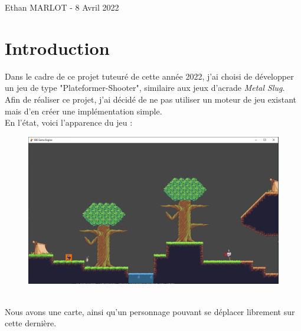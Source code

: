 \documentclass[12pt, openany]{report}
\begin{document}
\begin{titlepage}
\begin{rmfamily}
\begin{center}
    \vfill

    {\large Ethan \textsc{MARLOT} - 8 Avril 2022}

  \end{center}
  \end{rmfamily}
\end{titlepage}

\tableofcontents

\chapter{Introduction}
Dans le cadre de ce projet tuteur\'e de cette ann\'ee 2022, j'ai choisi de d\'evelopper un jeu de type "Plateformer-Shooter", similaire aux jeux d'acrade \textit{Metal Slug}. Afin de r\'ealiser ce projet, j'ai d\'ecid\'e de ne pas utiliser un moteur de jeu existant mais d'en cr\'eer une impl\'ementation simple.
\\[0.5cm]
\indent En l'\'etat, voici l'apparence du jeu :\\[0.2cm]
\begin{figure}[!h]
\centering
\includegraphics[scale=0.5]{etatJeuActuel.png}
\end{figure}
\\[0.5cm]
\indent Nous avons une carte, ainsi qu'un personnage pouvant se d\'eplacer librement sur cette derni\`ere.
\end{document}
